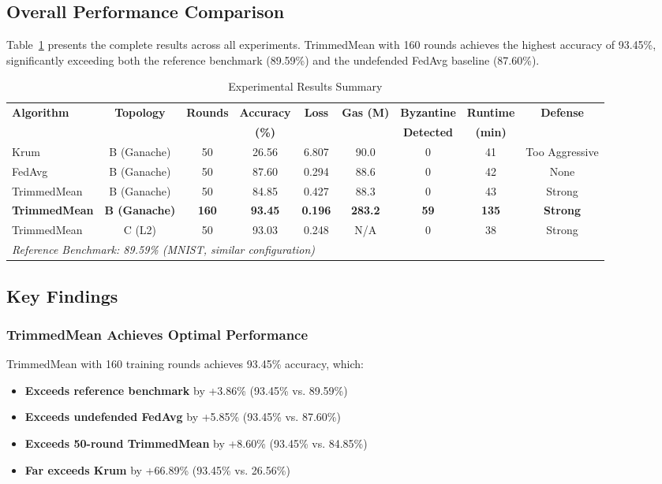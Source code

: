 \documentclass[12pt,a4paper,onecolumn]{article}
\begin{document}
\subsection{Overall Performance Comparison}

Table~\ref{tab:overall_results} presents the complete results across all experiments. TrimmedMean with 160 rounds achieves the highest accuracy of 93.45\%, significantly exceeding both the reference benchmark (89.59\%) and the undefended FedAvg baseline (87.60\%).

\begin{table}[t]
\caption{Experimental Results Summary}
\label{tab:overall_results}
\centering
\begin{tabular}{lcccccccc}
\toprule
\textbf{Algorithm} & \textbf{Topology} & \textbf{Rounds} & \textbf{Accuracy} & \textbf{Loss} & \textbf{Gas (M)} & \textbf{Byzantine} & \textbf{Runtime} & \textbf{Defense} \\
& & & \textbf{(\%)} & & & \textbf{Detected} & \textbf{(min)} & \\
\midrule
Krum & B (Ganache) & 50 & 26.56 & 6.807 & 90.0 & 0 & 41 & Too Aggressive \\
FedAvg & B (Ganache) & 50 & 87.60 & 0.294 & 88.6 & 0 & 42 & None \\
TrimmedMean & B (Ganache) & 50 & 84.85 & 0.427 & 88.3 & 0 & 43 & Strong \\
\textbf{TrimmedMean} & \textbf{B (Ganache)} & \textbf{160} & \textbf{93.45} & \textbf{0.196} & \textbf{283.2} & \textbf{59} & \textbf{135} & \textbf{Strong} \\
TrimmedMean & C (L2) & 50 & 93.03 & 0.248 & N/A & 0 & 38 & Strong \\
\midrule
\multicolumn{9}{l}{\textit{Reference Benchmark: 89.59\% (MNIST, similar configuration)}} \\
\bottomrule
\end{tabular}
\end{table}

\subsection{Key Findings}

\subsubsection{TrimmedMean Achieves Optimal Performance}

TrimmedMean with 160 training rounds achieves 93.45\% accuracy, which:
\begin{itemize}
    \item \textbf{Exceeds reference benchmark} by +3.86\% (93.45\% vs. 89.59\%)
    \item \textbf{Exceeds undefended FedAvg} by +5.85\% (93.45\% vs. 87.60\%)
    \item \textbf{Exceeds 50-round TrimmedMean} by +8.60\% (93.45\% vs. 84.85\%)
    \item \textbf{Far exceeds Krum} by +66.89\% (93.45\% vs. 26.56\%)
\end{itemize}
\end{document}
